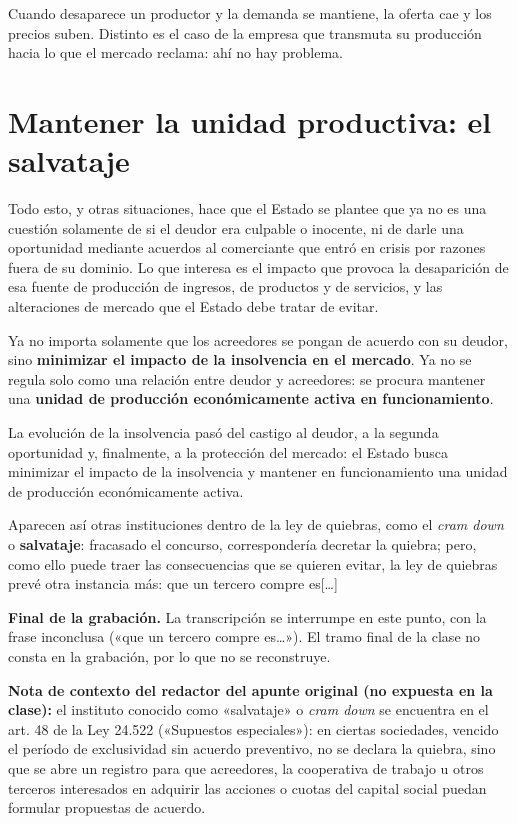 \documentclass[12pt,oneside]{book}
\begin{document}
\begin{important}
Cuando desaparece un productor y la demanda se mantiene, la oferta cae y los precios suben. Distinto es el caso de la empresa que transmuta su producción hacia lo que el mercado reclama: ahí no hay problema.
\end{important}

\section{Mantener la unidad productiva: el salvataje}

Todo esto, y otras situaciones, hace que el Estado se plantee que ya no es una cuestión solamente de si el deudor era culpable o inocente, ni de darle una oportunidad mediante acuerdos al comerciante que entró en crisis por razones fuera de su dominio. Lo que interesa es el impacto que provoca la desaparición de esa fuente de producción de ingresos, de productos y de servicios, y las alteraciones de mercado que el Estado debe tratar de evitar.

Ya no importa solamente que los acreedores se pongan de acuerdo con su deudor, sino \textbf{minimizar el impacto de la insolvencia en el mercado}. Ya no se regula solo como una relación entre deudor y acreedores: se procura mantener una \textbf{unidad de producción económicamente activa en funcionamiento}.

\begin{important}
La evolución de la insolvencia pasó del castigo al deudor, a la segunda oportunidad y, finalmente, a la protección del mercado: el Estado busca minimizar el impacto de la insolvencia y mantener en funcionamiento una unidad de producción económicamente activa.
\end{important}

Aparecen así otras instituciones dentro de la ley de quiebras, como el \textit{cram down} o \textbf{salvataje}: fracasado el concurso, correspondería decretar la quiebra; pero, como ello puede traer las consecuencias que se quieren evitar, la ley de quiebras prevé otra instancia más: que un tercero compre es[\ldots]


\begin{note}
\textbf{Final de la grabación.} La transcripción se interrumpe en este punto, con la frase inconclusa («que un tercero compre es\ldots»). El tramo final de la clase no consta en la grabación, por lo que no se reconstruye.

\textbf{Nota de contexto del redactor del apunte original (no expuesta en la clase):} el instituto conocido como «salvataje» o \textit{cram down} se encuentra en el art. 48 de la Ley 24.522 («Supuestos especiales»): en ciertas sociedades, vencido el período de exclusividad sin acuerdo preventivo, no se declara la quiebra, sino que se abre un registro para que acreedores, la cooperativa de trabajo u otros terceros interesados en adquirir las acciones o cuotas del capital social puedan formular propuestas de acuerdo.
\end{note}
\end{document}
